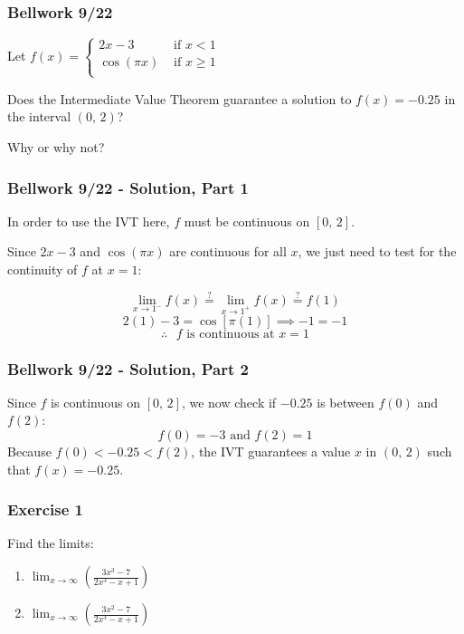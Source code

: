 \documentclass[12pt]{beamer}
\begin{document}
\begin{frame}
	\frametitle{Bellwork 9/22}

	\large
	\initclock
	\begin{center}
		Let $f(x) =
			\begin{cases}
				2x - 3      & \text{ if } x < 1    \\
				\cos(\pi x) & \text{ if } x \geq 1 \\
			\end{cases}$ \\
	\end{center}
	\vfill
	Does the Intermediate Value Theorem guarantee a solution to $f(x) = -0.25$ in the interval $(0\text{, } 2)$?\par
	\vfill
	Why or why not?\par
	\vfill
	\vfill
	\crono
\end{frame}
\begin{frame}
	\frametitle{Bellwork 9/22 - Solution, Part 1}

	\vfill
	In order to use the IVT here, $f$ must be continuous on $[0\text{, } 2]$.\par
	\vfill
	Since $2x-3$ and $\cos(\pi x)$ are continuous for all $x$, we just need to test for the continuity of $f$ at $x=1$:\par
	\[\displaystyle\lim_{x\to1^{-}}f(x)\stackrel{?}{=}\displaystyle\lim_{x\to1^{+}}f(x)\stackrel{?}{=}f(1)\]
	\[2(1)-3=\cos[\pi(1)]\implies -1=-1\]
	\[\text{$\therefore$ $f$ is continuous at $x=1$}\]
\end{frame}
\begin{frame}
	\frametitle{Bellwork 9/22 - Solution, Part 2}

	\vfill
	\vfill
	\vfill
	Since $f$ is continuous on $[0\text{, } 2]$, we now check if $-0.25$ is between $f(0)$ and $f(2)$:
	\[\text{$f(0)=-3$ and $f(2)=1$}\]
	\vfill
	Because $f(0) < -0.25 < f(2)$, the IVT guarantees a value $x$ in $(0\text{, } 2)$ such that $f(x)=-0.25$.
	\vfill
	\vfill
	\vfill
\end{frame}
\begin{frame}
	\frametitle{Exercise 1}

	\Large
	Find the limits: \\
	\vfill
	\begin{enumerate}\itemsep4ex
		\item $\displaystyle\lim_{x\to\infty}\left(\frac{3x^3-7}{2x^3-x+1}\right)$
		\item $\displaystyle\lim_{x\to\infty}\left(\frac{3x^2-7}{2x^3-x+1}\right)$
	\end{enumerate}
\end{frame}
\end{document}
